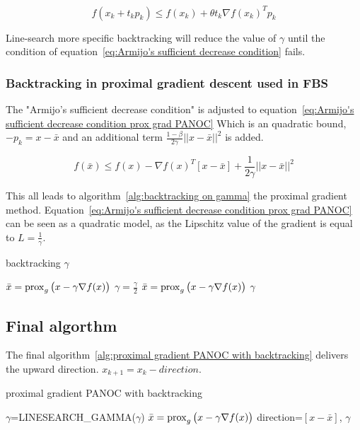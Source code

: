 			\begin{equation}
			f(x_k + t_kp_k) \leq f(x_k) + \theta t_k \nabla f(x_k)^Tp_k
			\label{eq:Armijo's sufficient decrease condition}
			\end{equation}
			
			Line-search more specific backtracking will reduce the value of $\gamma$ until the condition of equation~\ref{eq:Armijo's sufficient decrease condition} fails.
			
		\subsubsection{Backtracking in proximal gradient descent used in FBS}
			The  "Armijo's sufficient decrease condition" is adjusted to equation~\ref{eq:Armijo's sufficient decrease condition prox grad PANOC} Which is an quadratic bound, $-p_k=x-\bar{x}$ and an additional term $\frac{1-\beta}{2 \gamma}||x-\bar{x}||^2$ is added.
			
			\begin{equation}
			f({\bar{x}}) \leq f(x) - \nabla f(x)^T[x-\bar{x}] + \frac{1}{2 \gamma}||x-\bar{x}||^2
			\label{eq:Armijo's sufficient decrease condition prox grad PANOC}
			\end{equation}
			
			This all leads to algorithm~\ref{alg:backtracking on gamma} the proximal gradient method. Equation~\ref{eq:Armijo's sufficient decrease condition prox grad PANOC} can be seen as a quadratic model, as the Lipschitz value of the gradient is equal to $L=\frac{1}{\gamma}$.
			
			\begin{algorithm}
				\caption{backtracking $\gamma$}
				\label{alg:backtracking on gamma}
				\begin{algorithmic}[1]
					\State $\bar{x} = \operatorname{prox}_{g}\big( x- \gamma \nabla f(x)\big)$
					\State $\gamma = \frac{\gamma}{2}$
					\State $\bar{x} = \operatorname{prox}_{g}\big( x- \gamma \nabla f(x)\big)$
					\EndWhile
					\State \Return $\gamma$
					\EndProcedure
				\end{algorithmic}
			\end{algorithm}
	\subsection{Final algorthm}
		The final algorithm~\ref{alg:proximal gradient PANOC with backtracking} delivers the upward direction. $x_{k+1}=x_k - direction$.
		\begin{algorithm}
			\caption{proximal gradient PANOC with backtracking}
			\label{alg:proximal gradient PANOC with backtracking}
			\begin{algorithmic}[1]
				\Procedure{get\_proximal\_gradient\_step}{x,$\gamma$}
				\State $\gamma$=LINESEARCH\_GAMMA($\gamma$)
				\State $\bar{x} = \operatorname{prox}_{g}\big( x- \gamma \nabla f(x)\big)$
				\State \Return direction=$[x-\bar{x}]$, $\gamma$
				\EndProcedure
			\end{algorithmic}
		\end{algorithm}